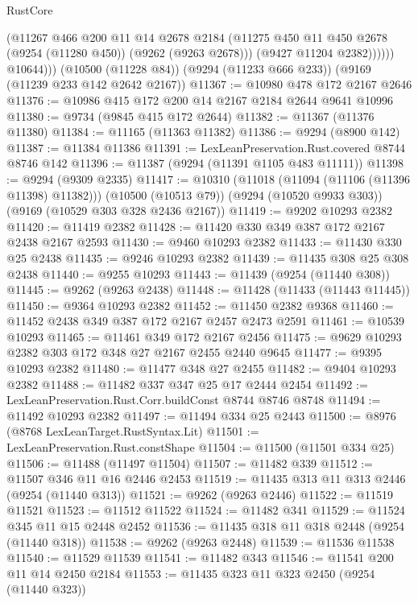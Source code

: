 \begin{lexlean}{RustCore}
\begin{coremodule}
                  (@11267
                    @466
                    @200
                    @11
                    @14
                    @2678
                    @2184
                    (@11275 @450 @11 @450 @2678 (@9254 (@11280 @450)) (@9262 (@9263 @2678)))
                    (@9427 @11204 @2382))))))
          @10644)))
    (@10500 (@11228 @84))
    (@9294 (@11233 @666 @233))
    (@9169 (@11239 @233 @142 @2642 @2167))
@11367 := @10980 @478 @172 @2167 @2646
@11376 := @10986 @415 @172 @200 @14 @2167 @2184 @2644 @9641 @10996
@11380 := @9734 (@9845 @415 @172 @2644)
@11382 := @11367 (@11376 @11380)
@11384 := @11165 (@11363 @11382)
@11386 := @9294 (@8900 @142)
@11387 := @11384 @11386
@11391 := LexLeanPreservation.Rust.covered @8744 @8746 @142
@11396 := @11387 (@9294 (@11391 @1105 @483 @11111))
@11398 := @9294 (@9309 @2335)
@11417 := @10310
    (@11018 (@11094 (@11106 (@11396 @11398) @11382)))
    (@10500 (@10513 @79))
    (@9294 (@10520 @9933 @303))
    (@9169 (@10529 @303 @328 @2436 @2167))
@11419 := @9202 @10293 @2382
@11420 := @11419 @2382
@11428 := @11420 @330 @349 @387 @172 @2167 @2438 @2167 @2593
@11430 := @9460 @10293 @2382
@11433 := @11430 @330 @25 @2438
@11435 := @9246 @10293 @2382
@11439 := @11435 @308 @25 @308 @2438
@11440 := @9255 @10293
@11443 := @11439 (@9254 (@11440 @308))
@11445 := @9262 (@9263 @2438)
@11448 := @11428 (@11433 (@11443 @11445))
@11450 := @9364 @10293 @2382
@11452 := @11450 @2382 @9368
@11460 := @11452 @2438 @349 @387 @172 @2167 @2457 @2473 @2591
@11461 := @10539 @10293
@11465 := @11461 @349 @172 @2167 @2456
@11475 := @9629 @10293 @2382 @303 @172 @348 @27 @2167 @2455 @2440 @9645
@11477 := @9395 @10293 @2382
@11480 := @11477 @348 @27 @2455
@11482 := @9404 @10293 @2382
@11488 := @11482 @337 @347 @25 @17 @2444 @2454
@11492 := LexLeanPreservation.Rust.Corr.buildConst @8744 @8746 @8748
@11494 := @11492 @10293 @2382
@11497 := @11494 @334 @25 @2443
@11500 := @8976 (@8768 LexLeanTarget.RustSyntax.Lit)
@11501 := LexLeanPreservation.Rust.constShape
@11504 := @11500 (@11501 @334 @25)
@11506 := @11488 (@11497 @11504)
@11507 := @11482 @339
@11512 := @11507 @346 @11 @16 @2446 @2453
@11519 := @11435 @313 @11 @313 @2446 (@9254 (@11440 @313))
@11521 := @9262 (@9263 @2446)
@11522 := @11519 @11521
@11523 := @11512 @11522
@11524 := @11482 @341
@11529 := @11524 @345 @11 @15 @2448 @2452
@11536 := @11435 @318 @11 @318 @2448 (@9254 (@11440 @318))
@11538 := @9262 (@9263 @2448)
@11539 := @11536 @11538
@11540 := @11529 @11539
@11541 := @11482 @343
@11546 := @11541 @200 @11 @14 @2450 @2184
@11553 := @11435 @323 @11 @323 @2450 (@9254 (@11440 @323))

\end{coremodule}
\end{lexlean}
